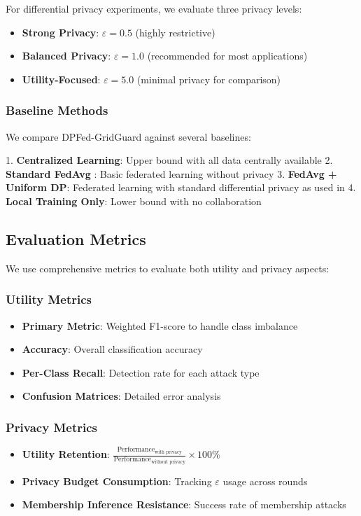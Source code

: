 \documentclass{ieeeaccess}
\theoremstyle{definition}
\begin{document}
For differential privacy experiments, we evaluate three privacy levels:
\begin{itemize}
\item \textbf{Strong Privacy}: $\varepsilon = 0.5$ (highly restrictive)
\item \textbf{Balanced Privacy}: $\varepsilon = 1.0$ (recommended for most applications)
\item \textbf{Utility-Focused}: $\varepsilon = 5.0$ (minimal privacy for comparison)
\end{itemize}

\subsubsection{Baseline Methods}

We compare DPFed-GridGuard against several baselines:

1. \textbf{Centralized Learning}: Upper bound with all data centrally available
2. \textbf{Standard FedAvg} \cite{mcmahan2017communication}: Basic federated learning without privacy
3. \textbf{FedAvg + Uniform DP}: Federated learning with standard differential privacy as used in \cite{ren2023efeddsa}
4. \textbf{Local Training Only}: Lower bound with no collaboration

\subsection{Evaluation Metrics}

We use comprehensive metrics to evaluate both utility and privacy aspects:

\subsubsection{Utility Metrics}
\begin{itemize}
\item \textbf{Primary Metric}: Weighted F1-score to handle class imbalance
\item \textbf{Accuracy}: Overall classification accuracy
\item \textbf{Per-Class Recall}: Detection rate for each attack type
\item \textbf{Confusion Matrices}: Detailed error analysis
\end{itemize}

\subsubsection{Privacy Metrics}
\begin{itemize}
\item \textbf{Utility Retention}: $\frac{\text{Performance}_{\text{with privacy}}}{\text{Performance}_{\text{without privacy}}} \times 100\%$
\item \textbf{Privacy Budget Consumption}: Tracking $\varepsilon$ usage across rounds
\item \textbf{Membership Inference Resistance}: Success rate of membership attacks
\end{itemize}
\end{document}
